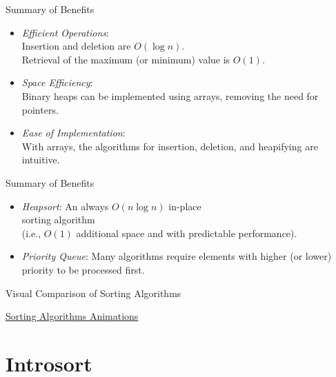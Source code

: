 \documentclass[14pt,aspectratio=1610]{beamer}
\begin{document}
\begin{frame}{Summary of Benefits}
\begin{itemize}[<+->]
  \item
    \emph{Efficient Operations}:\\
    Insertion and deletion are \(O(\log n)\).\\
    Retrieval of the maximum (or minimum) value is \(O(1)\).
  \item
    \emph{Space Efficiency}:\\
    Binary heaps can be implemented using arrays, removing the need for pointers.
  \item
    \emph{Ease of Implementation}:\\
    With arrays, the algorithms for insertion, deletion, and heapifying are intuitive.
  \end{itemize}
\end{frame}
\begin{frame}{Summary of Benefits}
  \begin{itemize}[<+->]
    \item
      \emph{Heapsort}: An always \(O(n \log{n})\) in-place\\
      sorting algorithm\\
      (i.e., \(O(1)\) additional space and with predictable performance).
    \item
      \emph{Priority Queue}: Many algorithms require elements with higher (or lower) priority to be processed first.
\end{itemize}
\end{frame}

\begin{frame}{Visual Comparison of Sorting Algorithms}
  \begin{center}\Large
    \href{https://www.toptal.com/developers/sorting-algorithms}{Sorting Algorithms Animations}
  \end{center}
\end{frame}

\section{Introsort}
\end{document}
